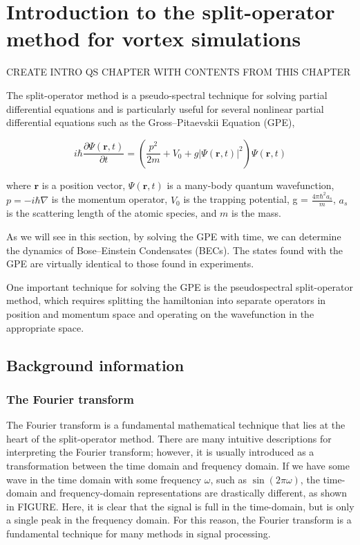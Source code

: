 \chapter{Introduction to the split-operator method for vortex simulations}
\label{ch-splitop}

CREATE INTRO QS CHAPTER WITH CONTENTS FROM THIS CHAPTER

The split-operator method is a pseudo-spectral technique for solving partial differential equations and is particularly useful for several nonlinear partial differential equations such as the Gross--Pitaevskii Equation (GPE),

$$
i \hbar \frac{\partial \Psi(\mathbf{r},t)}{\partial t} = \left(\frac{p^2}{2m} + V_0 + g |\Psi(\mathbf{r},t)|^2 \right)\Psi(\mathbf{r},t)
$$

where $\mathbf{r}$ is a position vector, $\Psi(\mathbf{r},t)$ is a many-body quantum wavefunction, $p = -i\hbar\nabla$ is the momentum operator, $V_0$ is the trapping potential, g = $\frac{4\pi\hbar^2 a_s}{m}$, $a_s$ is the scattering length of the atomic species, and $m$ is the mass.

As we will see in this section, by solving the GPE with time, we can determine the dynamics of Bose--Einstein Condensates (BECs).
The states found with the GPE are virtually identical to those found in experiments.

One important technique for solving the GPE is the pseudospectral split-operator method, which requires splitting the hamiltonian into separate operators in position and momentum space and operating on the wavefunction in the appropriate space.

\section{Background information}
\subsection{The Fourier transform}

The Fourier transform is a fundamental mathematical technique that lies at the heart of the split-operator method.
There are many intuitive descriptions for interpreting the Fourier transform; however, it is usually introduced as a transformation between the time domain and frequency domain.
If we have some wave in the time domain with some frequency $\omega$, such as $\sin(2\pi\omega)$, the time-domain and frequency-domain representations are drastically different, as shown in FIGURE.
Here, it is clear that the signal is full in the time-domain, but is only a single peak in the frequency domain.
For this reason, the Fourier transform is a fundamental technique for many methods in signal processing.

